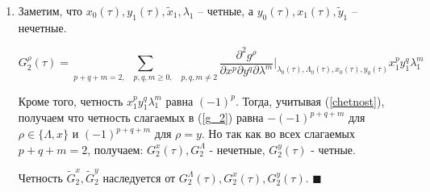 \begin{enumerate}
Следовательно, если определена четность множителя в скобках (т.е. определена четность всех решений порядка $\le k-1$), то четность $G_k^\Lambda(\tau),G_k^x(\tau),G_k^y(\tau)$ отличается на четность производных.
Учитывая, что четность производных одинакового порядка для $g^\Lambda$ и $g^x$ совпадает, а для $g^y$ отличается, получаем необходимое утверждение.

Четность $\tilde G_k^x, \tilde G_k^y$ наследуется от $G_k^\Lambda(\tau),G_k^x(\tau),G_k^y(\tau)$.

\item Заметим, что $x_0(\tau), y_1(\tau), \tilde x_1, \lambda_1$ -- четные, а $y_0(\tau), x_1(\tau), \tilde y_1$ -- нечетные.

\begin{equation}
G_2^\rho(\tau) = \sum_{p+q+m=2,\quad p,q,m \ge 0, \quad p,q,m \neq 2} \frac{\partial^{2}g^\rho}{\partial x^p \partial y^q \partial \lambda^m}\bigg|_{\lambda_0(\tau),\Lambda_0(\tau),x_0(\tau),y_0(\tau)} x_1^p y_1^q \lambda_1^m
\label{g_2}
\end{equation}

Кроме того, четность $x_1^p y_1^q \lambda_1^m$ равна $(-1)^p$. Тогда, учитывая (\ref{chetnost}), получаем что четность слагаемых в (\ref{g_2}) равна $-(-1)^{p+q+m}$ для $\rho \in \{ \Lambda, x \}$ и $(-1)^{p+q+m}$ для $\rho = y$. Но так как во всех слагаемых $p+q+m=2$, получаем:
$G_2^x(\tau), G_2^\Lambda$ - нечетные, $G_2^y(\tau)$ - четные.

Четность $\tilde G_2^x, \tilde G_2^y$ наследуется от $G_2^\Lambda(\tau),G_2^x(\tau),G_2^y(\tau)$.
$\blacksquare$
\end{enumerate}
